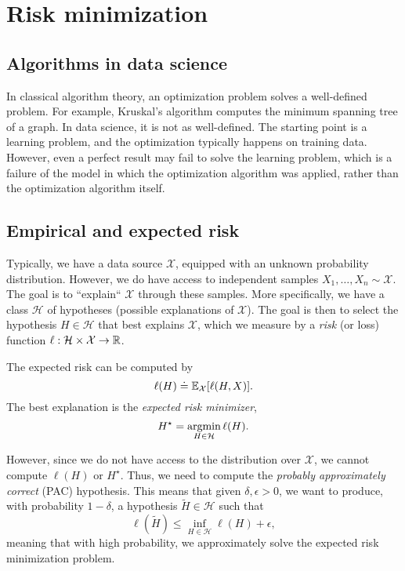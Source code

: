 \section{Risk minimization}

\subsection{Algorithms in data science}

In classical algorithm theory, an optimization problem solves a well-defined problem. For example,
Kruskal's algorithm computes the minimum spanning tree of a graph. In data science, it is not as
well-defined. The starting point is a learning problem, and the optimization typically happens on
training data. However, even a perfect result may fail to solve the learning problem, which is a
failure of the model in which the optimization algorithm was applied, rather than the optimization
algorithm itself.

\subsection{Empirical and expected risk}

Typically, we have a data source $\mathcal{X}$, equipped with an unknown probability distribution.
However, we do have access to independent samples $X_1,\ldots,X_n \sim \mathcal{X}$. The goal is to
``explain`` $\mathcal{X}$ through these samples. More specifically, we have a class $\mathcal{H}$ of
hypotheses (possible explanations of $\mathcal{X}$). The goal is then to select the hypothesis
$H\in \mathcal{H}$ that best explains $\mathcal{X}$, which we measure by a \textit{risk} (or loss)
function $\ell: \mathcal{H}\times \mathcal{X}\to \mathbb{R}$.

The expected risk can be computed by \[
    \ell(H) \doteq \mathbb{E}_{\mathcal{X}}[\ell(H, X)].
\]
The best explanation is the \textit{expected risk minimizer}, \[
    H^\star = \operatorname*{argmin}_{H\in \mathcal{H}} \ell(H).
\]

However, since we do not have access to the distribution over $\mathcal{X}$, we cannot compute
$\ell(H)$ or $H^\star$. Thus, we need to compute the \textit{probably approximately correct} (PAC)
hypothesis. This means that given $\delta,\epsilon > 0$, we want to produce, with probability
$1-\delta$, a hypothesis $\tilde{H}\in \mathcal{H}$ such that \[
    \ell(\tilde{H}) \leq \inf_{H\in \mathcal{H}} \ell(H) + \epsilon,
\]
meaning that with high probability, we approximately solve the expected risk minimization problem.

